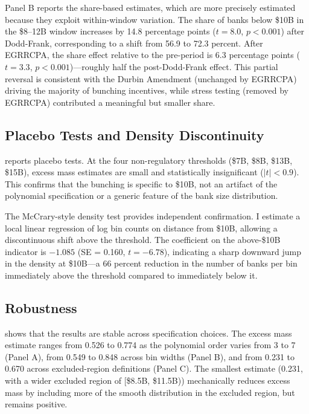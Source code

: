 \documentclass[12pt]{article}
\begin{document}
Panel B reports the share-based estimates, which are more precisely estimated because they exploit within-window variation. The share of banks below \$10B in the \$8--12B window increases by 14.8 percentage points ($t = 8.0$, $p < 0.001$) after Dodd-Frank, corresponding to a shift from 56.9 to 72.3 percent. After EGRRCPA, the share effect relative to the pre-period is 6.3 percentage points ($t = 3.3$, $p < 0.001$)---roughly half the post-Dodd-Frank effect. This partial reversal is consistent with the Durbin Amendment (unchanged by EGRRCPA) driving the majority of bunching incentives, while stress testing (removed by EGRRCPA) contributed a meaningful but smaller share.



\subsection{Placebo Tests and Density Discontinuity}

 reports placebo tests. At the four non-regulatory thresholds (\$7B, \$8B, \$13B, \$15B), excess mass estimates are small and statistically insignificant ($|t| < 0.9$). This confirms that the bunching is specific to \$10B, not an artifact of the polynomial specification or a generic feature of the bank size distribution.

The McCrary-style density test provides independent confirmation. I estimate a local linear regression of log bin counts on distance from \$10B, allowing a discontinuous shift above the threshold. The coefficient on the above-\$10B indicator is $-1.085$ (SE = 0.160, $t = -6.78$), indicating a sharp downward jump in the density at \$10B---a 66 percent reduction in the number of banks per bin immediately above the threshold compared to immediately below it.



\subsection{Robustness}

 shows that the results are stable across specification choices. The excess mass estimate ranges from 0.526 to 0.774 as the polynomial order varies from 3 to 7 (Panel A), from 0.549 to 0.848 across bin widths (Panel B), and from 0.231 to 0.670 across excluded-region definitions (Panel C). The smallest estimate (0.231, with a wider excluded region of [\$8.5B, \$11.5B)) mechanically reduces excess mass by including more of the smooth distribution in the excluded region, but remains positive.
\end{document}
